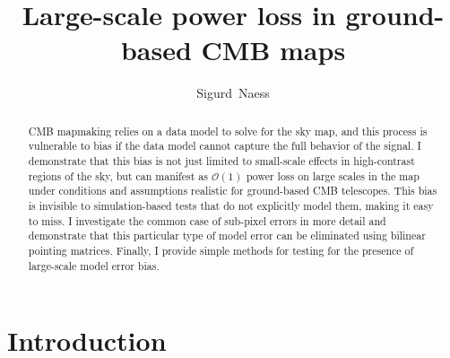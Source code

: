 \documentclass[twocolumn,apj]{aastex63}
\begin{document}
\title{Large-scale power loss in ground-based CMB maps}

\author[0000-0002-4478-7111]{Sigurd~Naess}

\keywords{}

\begin{abstract}
CMB mapmaking relies on a data model to solve for the sky map, and this
process is vulnerable to bias if the data model cannot capture the full
behavior of the signal. I demonstrate that this bias is not just limited to
small-scale effects in high-contrast regions of the sky, but can manifest
as $\mathcal{O}(1)$ power loss on large scales in the map under conditions
and assumptions realistic for ground-based CMB telescopes. This bias is
invisible to simulation-based tests that do not explicitly model them,
making it easy to miss. I investigate the common case of sub-pixel errors
in more detail and demonstrate that this particular type of model error can
be eliminated using bilinear pointing matrices. Finally, I provide simple
methods for testing for the presence of large-scale model error bias.
\end{abstract}

\section{Introduction}
\end{document}
